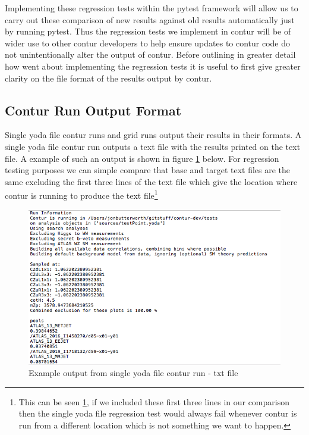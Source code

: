 Implementing these regression tests within the pytest framework will allow us to carry out these comparison of new results against old results automatically just by running pytest. Thus the regression tests we implement in contur will be of wider use to other contur developers to help ensure updates to contur code do not unintentionally alter the output of contur. Before outlining in greater detail how went about implementing the regression tests it is useful to first give greater clarity on the file format of the results output by contur.

\subsection{Contur Run Output Format}
Single yoda file contur runs and grid runs output their results in their formats. A single yoda file contur run outputs a text file with the results printed on the text file. A example of such an output is shown in figure \ref{fig:contur_txt_output} below. For regression testing purposes we can simple compare that base and target text files are the same excluding the first three lines of the text file which give the location where contur is running to produce the text file\footnote{This can be seen \ref{fig:contur_txt_output}, if we included these first three lines in our comparison then the single yoda file regression test would always fail whenever contur is run from a different location which is not something we want to happen.}

\begin{figure}[H]
\centering
\includegraphics[scale=0.6]{plots/single_yoda_run.png}
\caption{Example output from single yoda file contur run - txt file}
\label{fig:contur_txt_output}
\end{figure}

